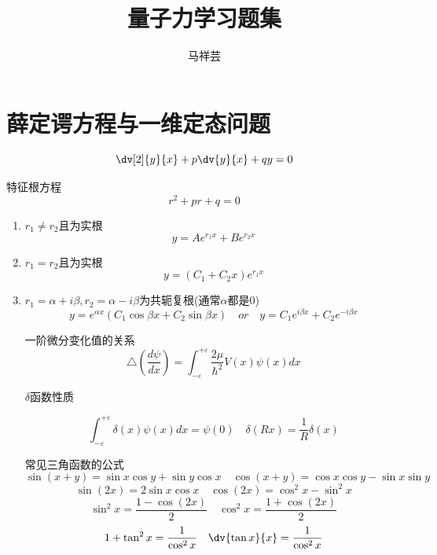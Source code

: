 

\title{量子力学习题集}
\author{马祥芸}


    \maketitle
    \tableofcontents
    \newpage

    \section{薛定谔方程与一维定态问题}

        \begin{formal}
            $$ \dv[2]{y}{x} + p\dv{y}{x} + qy = 0 $$
            
            特征根方程
            $$ r^{2} + pr + q = 0 $$

            \begin{enumerate}
                \item $r_{1} \neq r_{2}$且为实根
                $$ y = Ae^{r_{1}x} + Be^{r_{2}x} $$
                \item $r_{1} = r_{2}$且为实根
                $$ y = (C_{1}+C_{2}x)e^{r_{1}x} $$
                \item $r_{1}=\alpha + i \beta,r_{2} = \alpha - i \beta $为共轭复根(通常$\alpha$都是0)
                $$ y = e^{\alpha x} (C_{1}\cos{\beta x} + C_{2}\sin{\beta x}) \quad or \quad y = C_{1}e^{i\beta x} + C_{2}e^{-i\beta x}$$

                一阶微分变化值的关系
                $$ \triangle(\frac{d\psi}{dx}) = \int_{-\varepsilon}^{+\varepsilon}\frac{2\mu}{\hbar^2}V(x)\psi(x)dx $$    

                $\delta$函数性质

                $$\int_{-\varepsilon}^{+\varepsilon} \delta(x) \psi(x) dx =\psi(0) \quad \delta(Rx) = \frac{1}{R} \delta(x) $$

                常见三角函数的公式
                $$\sin(x+y)=\sin{x} \cos{y}+\sin{y}\cos{x} \quad \cos(x+y)=\cos{x} \cos{y} - \sin{x}\sin{y}$$ 
                $$\sin(2x) = 2\sin{x} \cos{x} \quad \cos(2x) = \cos^{2}{x} - \sin^{2}{x} $$
                $$\sin^{2}{x}=\frac{1-\cos(2x)}{2} \quad \cos^{2}{x}=\frac{1+\cos(2x)}{2} $$
                $$ 1 + \tan^{2}{x} = \frac{1}{\cos^{2}{x}} \quad \dv{\tan{x}}{x} = \frac{1}{\cos^{2}{x}} $$


\end{enumerate}
\end{formal}
